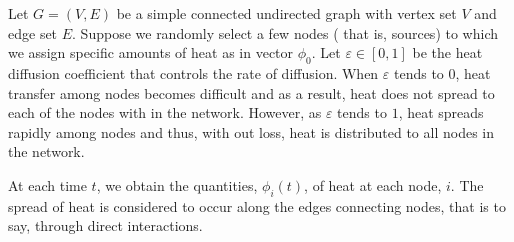 \documentclass[10pt,a4paper]{article}
\theoremstyle{plain}
\theoremstyle{definition}
\begin{document}
    
    Let $G=(V,E)$ be a simple connected undirected graph with vertex set $V$ and edge set $E$. Suppose we randomly select a few nodes ( that is, sources) to which we assign specific amounts of heat as in vector $\phi_0$. Let $\varepsilon \in [0,1]$ be the heat diffusion coefficient that controls the rate of diffusion. When $\varepsilon$ tends to $0$, heat transfer among nodes becomes difficult and as a result, heat does not spread to each of the nodes with in the network. However, as $\varepsilon$ tends to $1$, heat spreads rapidly among nodes and thus, with out loss, heat is distributed to all nodes in the network.
    
   At each time $t$, we obtain the quantities, $\phi_i(t)$, of heat at each node, $i$. The spread of heat is considered to occur along the edges connecting nodes, that is to say, through direct interactions.  
    	
\end{document}

